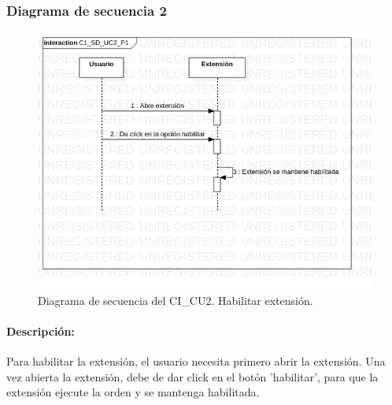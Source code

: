 \documentclass[12pt, a4paper, titlepage]{report}
\begin{document}
    		     \subsubsection{Diagrama de secuencia 2}
    			    \begin{figure}[H]
    				    \begin{center} \includegraphics[width=15cm]{./imagenes/Disenio/Componente_1/C1_SD_UC2_P1.png}
    				    \caption[Diagrama de secuencia 2 del Componente I]{Diagrama de secuencia del CI\_CU2. Habilitar extensión.}
    			        \end{center}
    			    \end{figure}
    			    
    			    \paragraph{Descripción:}
    			    Para habilitar la extensión, el usuario necesita primero abrir la extensión. Una vez abierta la extensión, debe de dar click en el botón 'habilitar', para que la extensión ejecute la orden y se mantenga habilitada.
    			    
    			
\end{document}
